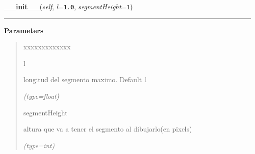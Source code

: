 \hspace{.8\funcindent}\begin{boxedminipage}{\funcwidth}

    \raggedright \textbf{\_\_init\_\_}(\textit{self}, \textit{l}={\tt 1.0}, \textit{segmentHeight}={\tt 1})

    \vspace{-1.5ex}

    \rule{\textwidth}{0.5\fboxrule}
\setlength{\parskip}{2ex}
\setlength{\parskip}{1ex}
      \textbf{Parameters}
      \vspace{-1ex}

      \begin{quote}
        \begin{Ventry}{xxxxxxxxxxxxx}

          \item[l]

          longitud del segmento maximo. Default 1

            {\it (type=float)}

          \item[segmentHeight]

          altura que va a tener el segmento al dibujarlo(en pixels)

            {\it (type=int)}

        \end{Ventry}

      \end{quote}

    \end{boxedminipage}

    \label{FractalZE:cantor:Cantor:countSegments}

    \vspace{0.5ex}

